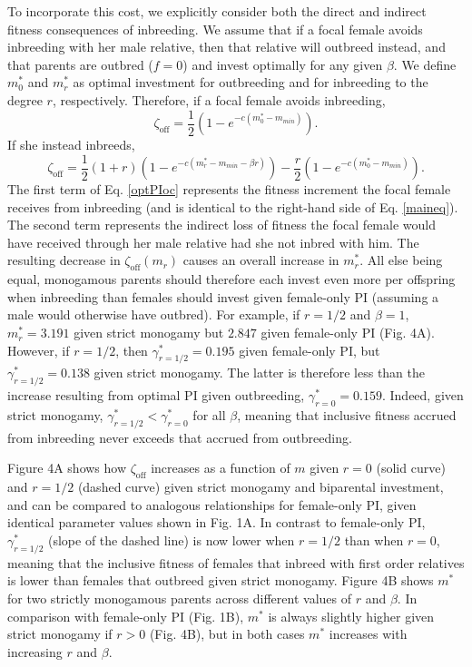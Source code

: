 \documentclass[12pt]{article}
\begin{document}
To incorporate this cost, we explicitly consider both the direct and indirect fitness consequences of inbreeding. We assume that if a focal female avoids inbreeding with her male relative, then that relative will outbreed instead, and that parents are outbred ($f=0$) and invest optimally for any given $\beta$. We define $m^{*}_{0}$ and $m^{*}_{r}$ as optimal investment for outbreeding and for inbreeding to the degree $r$, respectively. Therefore, if a focal female avoids inbreeding,
\begin{equation} \label{optPI}
\zeta_{\textrm{off}} = \frac{1}{2}\left(1-e^{-c\left(m^{*}_{0}-m_{min}\right)}\right).
\end{equation}
If she instead inbreeds,
\begin{equation} \label{optPIoc}
\zeta_{\textrm{off}} = \frac{1}{2}\left(1+r\right)\left(1-e^{-c\left(m^{*}_{r}-m_{min}-\beta r\right)}\right) - \frac{r}{2}\left(1-e^{-c\left(m^{*}_{0}-m_{min}\right)}\right).
\end{equation} 
The first term of Eq. \ref{optPIoc} represents the fitness increment the focal female receives from inbreeding (and is identical to the right-hand side of Eq. \ref{maineq}). The second term represents the indirect loss of fitness the focal female would have received through her male relative had she not inbred with him. The resulting decrease in $\zeta_{\textrm{off}}(m_{r})$ causes an overall increase in $m^{*}_{r}$. All else being equal, monogamous parents should therefore each invest even more per offspring when inbreeding than females should invest given female-only PI (assuming a male would otherwise have outbred). For example, if $r=1/2$ and $\beta=1$, $m^{*}_{r}= 3.191$ given strict monogamy but $2.847$ given female-only PI (Fig. 4A). However, if $r=1/2$, then $\gamma^{*}_{r=1/2}=0.195$ given female-only PI, but $\gamma^{*}_{r=1/2}=0.138$ given strict monogamy. The latter is therefore less than the increase resulting from optimal PI given outbreeding, $\gamma^{*}_{r=0}=0.159$. Indeed, given strict monogamy, $\gamma^{*}_{r=1/2} < \gamma^{*}_{r=0}$ for all $\beta$, meaning that inclusive fitness accrued from inbreeding never exceeds that accrued from outbreeding.

Figure 4A shows how $\zeta_{\textrm{off}}$ increases as a function of $m$ given $r=0$ (solid curve) and $r=1/2$ (dashed curve) given strict monogamy and biparental investment, and can be compared to analogous relationships for female-only PI, given identical parameter values shown in Fig. 1A. In contrast to female-only PI, $\gamma^{*}_{r=1/2}$ (slope of the dashed line) is now lower when $r=1/2$ than when $r=0$, meaning that the inclusive fitness of females that inbreed with first order relatives is lower than females that outbreed given strict monogamy. Figure 4B shows $m^{*}$ for two strictly monogamous parents across different values of $r$ and $\beta$. In comparison with female-only PI (Fig. 1B), $m^{*}$ is always slightly higher given strict monogamy if $r>0$ (Fig. 4B), but in both cases $m^{*}$ increases with increasing $r$ and $\beta$. 
\end{document}
